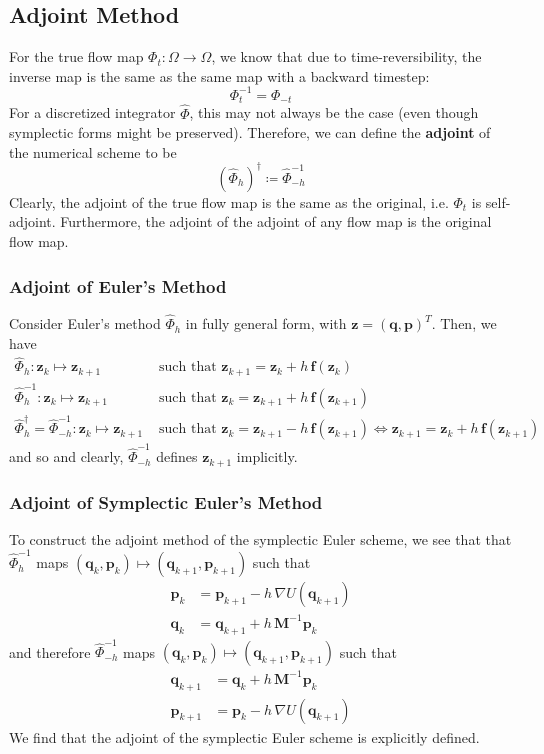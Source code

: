 \documentclass{article}
\theoremstyle{remark}
\theoremstyle{definition}
\begin{document}
\subsection{Adjoint Method}
For the true flow map $\Phi_t: \Omega \longrightarrow \Omega$, we know that due to time-reversibility, the inverse map is the same as the same map with a backward timestep: 
\[\Phi_t^{-1} = \Phi_{-t}\]
For a discretized integrator $\hat{\Phi}$, this may not always be the case (even though symplectic forms might be preserved). Therefore, we can define the \textbf{adjoint} of the numerical scheme to be 
\[(\hat{\Phi}_{h})^\dagger \coloneqq \hat{\Phi}_{-h}^{-1}\]
Clearly, the adjoint of the true flow map is the same as the original, i.e. $\Phi_t$ is self-adjoint. Furthermore, the adjoint of the adjoint of any flow map is the original flow map. 

\subsubsection{Adjoint of Euler's Method}
Consider Euler's method $\hat{\Phi}_{h}$ in fully general form, with $\mathbf{z} = (\mathbf{q}, \mathbf{p})^T$. Then, we have 
\begin{align*}
    \hat{\Phi}_{h}: \mathbf{z}_k \mapsto \mathbf{z}_{k+1} & \text{ such that } \mathbf{z}_{k + 1} = \mathbf{z}_k + h \,\mathbf{f}( \mathbf{z}_k) \\
    \hat{\Phi}_{h}^{-1}: \mathbf{z}_k \mapsto \mathbf{z}_{k+1} & \text{ such that } \mathbf{z}_{k} = \mathbf{z}_{k+1} + h \,\mathbf{f}( \mathbf{z}_{k+1}) \\
    \hat{\Phi}_h^\dagger = \hat{\Phi}_{-h}^{-1}: \mathbf{z}_k \mapsto \mathbf{z}_{k+1} & \text{ such that } \mathbf{z}_{k} = \mathbf{z}_{k+1} - h \,\mathbf{f}( \mathbf{z}_{k+1}) \iff \mathbf{z}_{k+1} = \mathbf{z}_k + h\, \mathbf{f}(\mathbf{z}_{k+1}) 
\end{align*}
and so 
and clearly, $\hat{\Phi}_{-h}^{-1}$ defines $\mathbf{z}_{k+1}$ implicitly. 

\subsubsection{Adjoint of Symplectic Euler's Method}
To construct the adjoint method of the symplectic Euler scheme, we see that that $\hat{\Phi}_{h}^{-1}$ maps $(\mathbf{q}_k, \mathbf{p}_k) \mapsto (\mathbf{q}_{k+1}, \mathbf{p}_{k+1})$ such that
\begin{align*}
    \mathbf{p}_k & = \mathbf{p}_{k+1} - h \, \nabla U(\mathbf{q}_{k+1}) \\
    \mathbf{q}_k & = \mathbf{q}_{k+1} + h \, \mathbf{M}^{-1} \mathbf{p}_{k} 
\end{align*}
and therefore $\hat{\Phi}_{- h}^{-1}$ maps $(\mathbf{q}_k, \mathbf{p}_k) \mapsto (\mathbf{q}_{k+1}, \mathbf{p}_{k+1})$ such that
\begin{align*}
    \mathbf{q}_{k+1} & = \mathbf{q}_k + h \, \mathbf{M}^{-1} \mathbf{p}_k \\
    \mathbf{p}_{k+1} & = \mathbf{p}_k - h \, \nabla U (\mathbf{q}_{k+1})
\end{align*}
We find that the adjoint of the symplectic Euler scheme is explicitly defined. 
\end{document}
